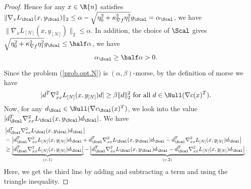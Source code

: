 \begin{proof}
Hence for any $x\in\R{n}$ satisfies $\|\nabla_x L_\Scal(x,y_\Scal)\|_2\le \alpha-  \sqrt{\eta_0^2+\kappa_{\nabla f}^2\eta_1^2}g_\Scal=\alpha_\Scal$, we have $\|\nabla_x L_{[N]}(x,y_{[N]})\|_2\le  \alpha$.
In addition, the choice of $\Scal$ gives $\sqrt{\eta_0^2+\kappa_{\nabla f}^2\eta_1^2}g_\Scal\le\half\alpha$, we have
\[
 \alpha_\Scal\ge\half\alpha>0.
\]

Since the problem (\ref{prob.opt.N}) is $(\alpha,\beta)$-morse, by the definition of morse we have 
\[
|d^T\nabla^2_{xx}L_{[N]}(x,y_{[N]} )d|\ge\beta\|d\|_2^2 \text{ for all } d\in\Null(\nabla c(x)^T).
\]
Now, for any $d_\Scal\in\Null(\nabla c_\Scal(x)^T)$, we look into the value $|d_\Scal^T\nabla^2_{xx}L_\Scal(x,y_\Scal)d_\Scal|$. We have
\begin{align*}
&\left|d_\Scal^T\nabla^2_{xx}L_\Scal(x,y_\Scal)d_\Scal\right|\\
	&=\left| d^T_\Scal\nabla^2_{xx}L_{[N]}(x,y_{[N]})d_\Scal+d_\Scal^T\nabla^2_{xx}L_\Scal(x,y_\Scal)d_\Scal-d^T_\Scal\nabla^2_{xx}L_{[N]}(x,y_{[N]})d_\Scal\right|\\
	&\ge \underbrace{\left| d_\Scal^T\nabla^2_{xx}L_{[N]}(x,y_{[N]})d_\Scal\right|}_{(v.1)}-\underbrace{\left|d_\Scal^T\nabla^2_{xx}L_\Scal(x,y_\Scal)d_\Scal-d_\Scal^T\nabla^2_{xx}L_{[N]}(x,y_{[N]})d_\Scal\right|}_{(v.2)}.
\end{align*}
Here, we get the third line by adding and subtracting a term and using the triangle inequality. 


\end{proof}
